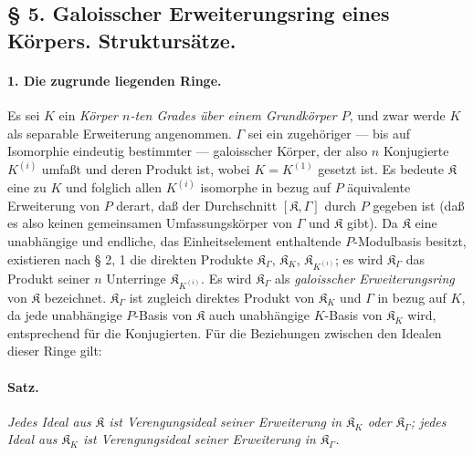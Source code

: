 \subsection*{\S{} 5. Galoisscher Erweiterungsring eines Körpers. Struktursätze.}

\paragraph{1. Die zugrunde liegenden Ringe.}
Es sei $K$ ein \emph{Körper $n$-ten Grades über einem Grundkörper $P$}, und zwar werde $K$ als separable Erweiterung angenommen. $\Gamma$ sei ein zugehöriger --- bis auf Isomorphie eindeutig bestimmter --- galoisscher Körper, der also $n$ Konjugierte $K^{(i)}$ umfaßt und deren Produkt ist, wobei $K=K^{(1)}$ gesetzt ist. Es bedeute $\mathfrak K$ eine zu $K$ und folglich allen $K^{(i)}$ isomorphe in bezug auf $P$ äquivalente Erweiterung von $P$ derart, daß der Durchschnitt $[\mathfrak K,\Gamma]$ durch $P$ gegeben ist (daß es also keinen gemeinsamen Umfassungskörper von $\Gamma$ und $\mathfrak K$ gibt). Da $\mathfrak K$ eine unabhängige und endliche, das Einheitselement enthaltende $P$-Modulbasis besitzt, existieren nach § 2, 1 die direkten Produkte $\mathfrak K_\Gamma$, $\mathfrak K_K$, $\mathfrak K_{K^{(i)}}$; es wird $\mathfrak K_\Gamma$ das Produkt seiner $n$ Unterringe $\mathfrak K_{K^{(i)}}$. Es wird $\mathfrak K_\Gamma$ als \emph{galoisscher Erweiterungsring} von $\mathfrak K$ bezeichnet. $\mathfrak K_\Gamma$ ist zugleich direktes Produkt von $\mathfrak K_K$ und $\Gamma$ in bezug auf $K$, da jede unabhängige $P$-Basis von $\mathfrak K$ auch unabhängige $K$-Basis von $\mathfrak K_K$ wird, entsprechend für die Konjugierten. Für die Beziehungen zwischen den Idealen dieser Ringe gilt:

\paragraph{Satz.}
\emph{Jedes Ideal aus $\mathfrak K$ ist Verengungsideal seiner Erweiterung in $\mathfrak K_K$ oder $\mathfrak K_\Gamma$; jedes Ideal aus $\mathfrak K_K$ ist Verengungsideal seiner Erweiterung in $\mathfrak K_\Gamma$.}

